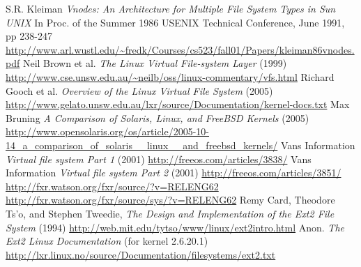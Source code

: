 \documentclass[oneside]{book}
\begin{document}
\begin{thebibliography}{10}
 S.R. Kleiman \textit{Vnodes: An Architecture for Multiple File System Types in Sun UNIX} In Proc. of the Summer 1986 USENIX Technical Conference, June 1991, pp 238-247 \url{http://www.arl.wustl.edu/~fredk/Courses/cs523/fall01/Papers/kleiman86vnodes.pdf}
 Neil Brown et al. \textit{The Linux Virtual File-system Layer} (1999) \url{http://www.cse.unsw.edu.au/~neilb/oss/linux-commentary/vfs.html}
 Richard Gooch et al. \textit{Overview of the Linux Virtual File System} (2005) \url{http://www.gelato.unsw.edu.au/lxr/source/Documentation/kernel-docs.txt} 
 Max Bruning \textit{A Comparison of Solaris, Linux, and FreeBSD Kernels} (2005) \url{http://www.opensolaris.org/os/article/2005-10-14_a_comparison_of_solaris__linux__and_freebsd_kernels/}
 Vans Information \textit{Virtual file system Part 1} (2001) \url{http://freeos.com/articles/3838/}
 Vans Information \textit{Virtual file system Part 2} (2001) \url{http://freeos.com/articles/3851/}
 \url{http://fxr.watson.org/fxr/source/?v=RELENG62}
 \url{http://fxr.watson.org/fxr/source/sys/?v=RELENG62}
 Remy Card, Theodore Ts'o, and Stephen Tweedie, \textit{The Design and Implementation of the Ext2 File System} (1994) \url{http://web.mit.edu/tytso/www/linux/ext2intro.html}
 Anon. \textit{The Ext2 Linux Documentation} (for kernel 2.6.20.1)  \url{http://lxr.linux.no/source/Documentation/filesystems/ext2.txt}
\end{thebibliography}
\end{document}
